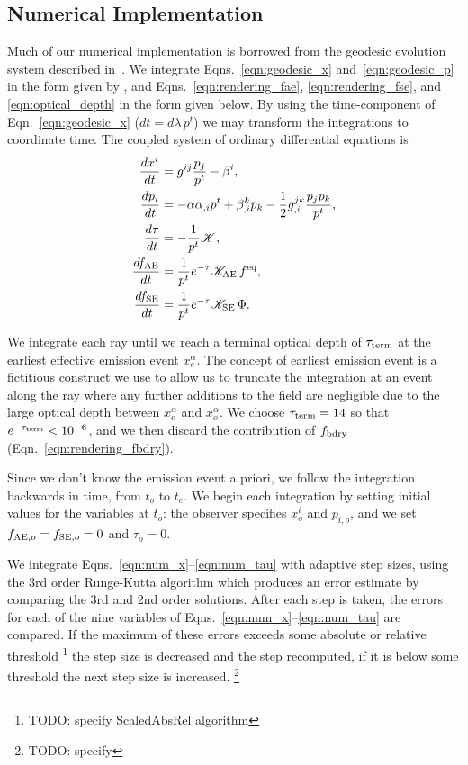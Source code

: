 \documentclass[aps,floatfix,prd,superscriptaddress,twocolumn]{revtex4-1}
\begin{document}
\subsection{Numerical Implementation}
\label{ssec:numerical}
Much of our numerical implementation is borrowed from the geodesic evolution
system described in~\cite{bohn2016-code}.
We integrate Eqns.~\ref{eqn:geodesic_x} and~\ref{eqn:geodesic_p} in the form
given by \citep{hugh1994-eh_finding},
and Eqns.~\ref{eqn:rendering_fae}, \ref{eqn:rendering_fse},
and \ref{eqn:optical_depth} in the form given below.
By using the time-component of Eqn.~\ref{eqn:geodesic_x} ($dt=d\lambda \, p^t$)
we may transform the integrations to coordinate time.
The coupled system of ordinary differential equations is
\begin{align}
  \label{eqn:num_x}
  \frac{dx^i}{dt} &=
  g^{ij} \frac{p_j}{p^t} - \beta^{i},\\
  \label{eqn:num_p}
  \frac{dp_i}{dt} &=
  -\alpha \alpha_{,i} p^t
  + \beta^k_{,i} p_k
  - \frac{1}{2} g^{jk}_{,i}\frac{p_j p_k}{p^t},\\
  \label{eqn:num_tau}
  \frac{d\tau}{dt} &=
  - \frac{1}{p^t}\mathscr{K},\\
  \label{eqn:num_fae}
  \frac{df_{\rm AE}}{dt} &=
  \frac{1}{p^t}e^{-\tau}\mathscr{K_{\rm AE}} \,f^{\rm eq},\\
  \label{eqn:num_fse}
  \frac{df_{\rm SE}}{dt} &=
  \frac{1}{p^t}e^{-\tau}\mathscr{K_{\rm SE}} \,\Phi.
\end{align}

We integrate each ray until we reach a terminal optical depth of
$\tau_{\rm term}$ at the earliest effective emission event $x_e^\alpha$.
The concept of earliest emission event is a fictitious construct we use
to allow us to truncate the integration at an event along the ray where any
further additions to the field are negligible due to the large optical depth
between $x_e^\alpha$ and $x_o^\alpha$.
We choose $\tau_{\rm term}=14$ so that $e^{-\tau_{\rm term}}<10^{-6}$,
and we then discard the contribution of $f_{\rm bdry}$
(Eqn.~\ref{eqn:rendering_fbdry}).

Since we don't know the emission event a priori,
we follow the integration backwards in time,
from $t_o$ to $t_e$.
We begin each integration by setting initial values for the variables at $t_o$:
the observer specifies $x^i_o$ and $p_{i,o}$,
and we set $f_{{\rm AE},o}=f_{{\rm SE},o}=0$ and $\tau_o=0$.

We integrate Eqns.~\ref{eqn:num_x}--\ref{eqn:num_tau} with adaptive step sizes,
using the 3rd order Runge-Kutta algorithm
which produces an error estimate by comparing the 3rd and 2nd order solutions.
After each step is taken, the errors for each of the nine variables of
Eqns.~\ref{eqn:num_x}--\ref{eqn:num_tau} are compared.
If the maximum of these errors exceeds some absolute or relative threshold
\footnote{TODO: specify ScaledAbsRel algorithm}
the step size is decreased and the step recomputed,
if it is below some threshold the next step size is increased.
\footnote{TODO: specify}
\end{document}
